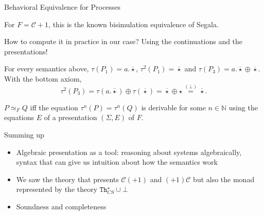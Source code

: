 \documentclass{beamer}
\newcommand{\C}{\mathcal C}
\newcommand{\Th}{\mathtt{Th}}
\begin{document}
\begin{frame}{Behavioral Equivalence for Processes}
        
    \begin{example}
        For $F = \C + 1$, this is the known %
        bisimulation equivalence of Segala.
    \end{example}

    How to compute it in practice in our case? \pause Using the continuations and the presentations!

    \begin{example}[ $P_2 = a^2.\operatorname{\overline{\star}}$
  and $ P_3 = a.(a.\operatorname{\overline{\star}} \overline \oplus \operatorname{\overline{\star}})$
   ]
    For every semantics above, $\tau(P_1) = a.\operatorname{\overline{\star}}$, $\tau^2(P_1) = \operatorname{\overline{\star}}$  and $ \tau(P_3) = a.\operatorname{\overline{\star}} \oplus \operatorname{\overline{\star}}$. With the bottom axiom,  $$\tau^2(P_3) = \tau(a.\operatorname{\overline{\star}}) \oplus \tau(\operatorname{\overline{\star}}) = \operatorname{\overline{\star}} \oplus \star \overset{(\bot)}{=} \operatorname{\overline{\star}} .$$
    \end{example}

     \pause

    \begin{theorem}
        $P \simeq_F Q$ iff the equation $\tau^n(P) = \tau^n(Q)$ is derivable for some $n\in \mathbb N$ using the equations $E$ of a presentation $(\Sigma, E)$ of $F$.
    \end{theorem}

\end{frame}

\begin{frame}{Summing up}
\pause
    \begin{itemize}
        \item Algebraic presentation as a tool: \pause reasoning about systems algebraically, syntax that can give us intuition about how the semantics work \pause
        \item We saw the theory that presents $\C(+1)$ and $(+1)\C$ \pause but also the monad represented by the theory $\Th^{\star}_{CS} \cup \bot$
        \pause
        \item Soundness and completeness 
    \end{itemize}
\end{frame}
\end{document}
